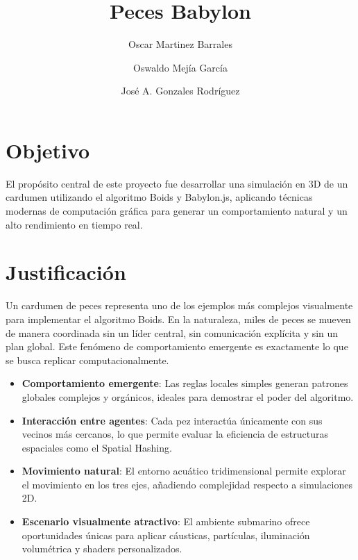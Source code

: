 \documentclass[acmtog]{acmart}
\begin{document}
\title{Peces Babylon}
\author{Oscar Martinez Barrales}

\author{Oswaldo Mejía García}

\author{José A. Gonzales Rodríguez}
\maketitle

\section*{Objetivo}

El propósito central de este proyecto fue desarrollar una simulación en 3D de un
cardumen utilizando el algoritmo Boids y Babylon.js, aplicando técnicas modernas de
computación gráfica para generar un comportamiento natural y un alto rendimiento en
tiempo real.

\section*{Justificación}

Un cardumen de peces representa uno de los ejemplos más complejos visualmente para implementar el algoritmo Boids. En la naturaleza, miles de peces se mueven de manera coordinada sin un líder central, sin comunicación explícita y sin un plan global. Este fenómeno de comportamiento emergente es exactamente lo que se busca replicar
computacionalmente.

\begin{itemize}
    \item \textbf{Comportamiento emergente}: Las reglas locales simples generan patrones globales complejos y orgánicos, ideales para demostrar el poder del algoritmo.
    \item \textbf{Interacción entre agentes}: Cada pez interactúa únicamente con sus vecinos más cercanos, lo que permite evaluar la eficiencia de estructuras espaciales como el Spatial Hashing.
    \item \textbf{Movimiento natural}: El entorno acuático tridimensional permite explorar el movimiento en los tres ejes, añadiendo complejidad respecto a simulaciones 2D.
    \item \textbf{Escenario visualmente atractivo}: El ambiente submarino ofrece oportunidades únicas para aplicar cáusticas, partículas, iluminación volumétrica y shaders personalizados.
\end{itemize}
\end{document}
